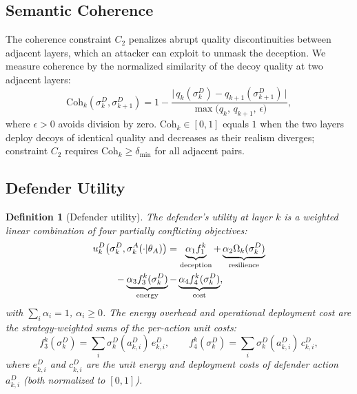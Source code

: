 \documentclass[conference]{IEEEtran}
\newtheorem{definition}{Definition}
\newcommand{\Coh}{\mathrm{Coh}}
\begin{document}
\subsection{Semantic Coherence}

The coherence constraint $C_2$ penalizes abrupt quality discontinuities between
adjacent layers, which an attacker can exploit to unmask the deception. We
measure coherence by the normalized similarity of the decoy quality at two
adjacent layers:
\begin{equation}
\Coh_k(\sigma_k^D,\sigma_{k+1}^D) =
1 - \frac{\bigl|\,q_k(\sigma_k^D) - q_{k+1}(\sigma_{k+1}^D)\,\bigr|}
{\max\!\bigl(q_k,\,q_{k+1},\,\epsilon\bigr)},
\label{eq:coherence}
\end{equation}
where $\epsilon>0$ avoids division by zero. $\Coh_k\in[0,1]$ equals $1$ when the
two layers deploy decoys of identical quality and decreases as their realism
diverges; constraint $C_2$ requires $\Coh_k\geq\delta_{\min}$ for all adjacent
pairs.

\subsection{Defender Utility}

\begin{definition}[Defender utility]\label{def:util_D}
The defender's utility at layer $k$ is a weighted linear combination of four
partially conflicting objectives:
\begin{align}
u_k^D&\!\left(\sigma_k^D,\sigma_k^A(\cdot|\theta_A)\right) =
\underbrace{\alpha_1 f_1^k}_{\text{deception}}
+ \underbrace{\alpha_2 \Omega_k(\sigma_k^D)}_{\text{resilience}} \notag\\
&\quad - \underbrace{\alpha_3 f_3^k(\sigma_k^D)}_{\text{energy}}
- \underbrace{\alpha_4 f_4^k(\sigma_k^D)}_{\text{cost}},
\label{eq:util_D_k}
\end{align}
with $\sum_i\alpha_i=1$, $\alpha_i\geq 0$. The energy overhead and operational
deployment cost are the strategy-weighted sums of the per-action unit costs:
\begin{equation}
f_3^k(\sigma_k^D) = \sum_i \sigma_k^D(a_{k,i}^D)\,e_{k,i}^D,
\qquad
f_4^k(\sigma_k^D) = \sum_i \sigma_k^D(a_{k,i}^D)\,c_{k,i}^D,
\label{eq:costs}
\end{equation}
where $e_{k,i}^D$ and $c_{k,i}^D$ are the unit energy and deployment costs of
defender action $a_{k,i}^D$ (both normalized to $[0,1]$).
\end{definition}
\end{document}
